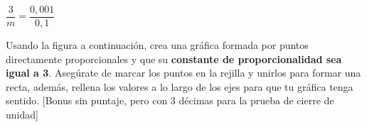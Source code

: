\documentclass[sin curso]{plantilla-evaluacion-v1}
\begin{document}
\begin{partes}
\begin{ejercicios}
\begin{tcbraster}[raster columns=2, raster column skip=4pt,raster width=.6\linewidth]
\begin{caja}[height=35pt,title=CP]
      \end{caja}
    \end{tcbraster}
    \ejercicio $\dfrac{3}{m} = \dfrac{0,001}{0,1}$
    \vspace*{30pt}
    \begin{tcbraster}[raster columns=2, raster column skip=4pt,raster width=.6\linewidth]
      \begin{caja}[height=35pt,title=$m$]
      \end{caja}
      \begin{caja}[height=35pt,title=CP]
      \end{caja}
    \end{tcbraster}
  \end{ejercicios}
\parte Usando la figura a continuación, crea una gráfica formada por puntos directamente
proporcionales y que su {\bfseries constante de proporcionalidad sea igual a 3}. 
Asegúrate de marcar los puntos en la rejilla y unirlos para formar una recta, 
además, rellena los valores a lo largo de los ejes para que tu gráfica tenga sentido. 
\hfill[Bonus sin puntaje, pero con 3 décimas para la prueba de cierre de unidad]
  

\end{partes}
\end{document}
